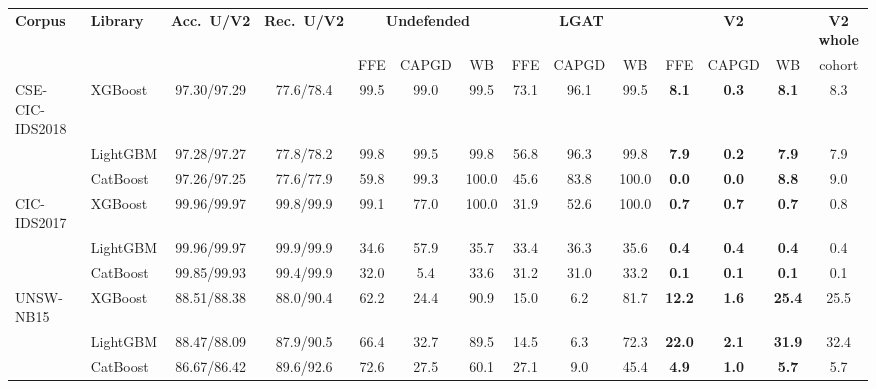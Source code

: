 \begin{tabular}{@{}llcccccccccccc@{}}
\toprule
\textbf{Corpus} & \textbf{Library} & \textbf{Acc.\ U/V2} & \textbf{Rec.\ U/V2} & \multicolumn{3}{c}{\textbf{Undefended}} & \multicolumn{3}{c}{\textbf{LGAT}} & \multicolumn{3}{c}{\textbf{V2}} & \textbf{V2 whole} \\
& & & & FFE & CAPGD & WB & FFE & CAPGD & WB & FFE & CAPGD & WB & cohort \\
\midrule
CSE-CIC-IDS2018 & XGBoost & 97.30/97.29 & 77.6/78.4 & 99.5 & 99.0 & 99.5 & 73.1 & 96.1 & 99.5 & \textbf{8.1} & \textbf{0.3} & \textbf{8.1} & 8.3 \\
 & LightGBM & 97.28/97.27 & 77.8/78.2 & 99.8 & 99.5 & 99.8 & 56.8 & 96.3 & 99.8 & \textbf{7.9} & \textbf{0.2} & \textbf{7.9} & 7.9 \\
 & CatBoost & 97.26/97.25 & 77.6/77.9 & 59.8 & 99.3 & 100.0 & 45.6 & 83.8 & 100.0 & \textbf{0.0} & \textbf{0.0} & \textbf{8.8} & 9.0 \\
\midrule
CIC-IDS2017 & XGBoost & 99.96/99.97 & 99.8/99.9 & 99.1 & 77.0 & 100.0 & 31.9 & 52.6 & 100.0 & \textbf{0.7} & \textbf{0.7} & \textbf{0.7} & 0.8 \\
 & LightGBM & 99.96/99.97 & 99.9/99.9 & 34.6 & 57.9 & 35.7 & 33.4 & 36.3 & 35.6 & \textbf{0.4} & \textbf{0.4} & \textbf{0.4} & 0.4 \\
 & CatBoost & 99.85/99.93 & 99.4/99.9 & 32.0 & 5.4 & 33.6 & 31.2 & 31.0 & 33.2 & \textbf{0.1} & \textbf{0.1} & \textbf{0.1} & 0.1 \\
\midrule
UNSW-NB15 & XGBoost & 88.51/88.38 & 88.0/90.4 & 62.2 & 24.4 & 90.9 & 15.0 & 6.2 & 81.7 & \textbf{12.2} & \textbf{1.6} & \textbf{25.4} & 25.5 \\
 & LightGBM & 88.47/88.09 & 87.9/90.5 & 66.4 & 32.7 & 89.5 & 14.5 & 6.3 & 72.3 & \textbf{22.0} & \textbf{2.1} & \textbf{31.9} & 32.4 \\
 & CatBoost & 86.67/86.42 & 89.6/92.6 & 72.6 & 27.5 & 60.1 & 27.1 & 9.0 & 45.4 & \textbf{4.9} & \textbf{1.0} & \textbf{5.7} & 5.7 \\
\bottomrule
\end{tabular}
